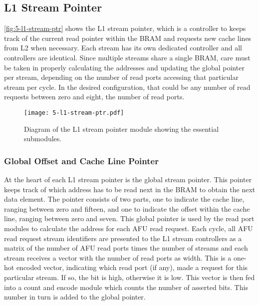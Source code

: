 \subsection{L1 Stream Pointer}
\label{sec:l1-ptr}
\autoref{fig:5-l1-stream-ptr} shows the L1 stream pointer, which is a controller to keeps track of the current read pointer within the BRAM and requests new cache lines from L2 when necessary. Each stream has its own dedicated controller and all controllers are identical. Since multiple streams share a single BRAM, care must be taken in properly calculating the addresses and updating the global pointer per stream, depending on the number of read ports accessing that particular stream per cycle. In the desired configuration, that could be any number of read requests between zero and eight, the number of read ports.

\begin{figure}[H]
  \centering
  \texttt{[image: 5-l1-stream-ptr.pdf]}
  \caption{Diagram of the L1 stream pointer module showing the essential submodules.}
  \label{fig:5-l1-stream-ptr}
\end{figure}

\subsubsection{Global Offset and Cache Line Pointer}
At the heart of each L1 stream pointer is the global stream pointer. This pointer keeps track of which address has to be read next in the BRAM to obtain the next data element. The pointer consists of two parts, one to indicate the cache line, ranging between zero and fifteen, and one to indicate the offset within the cache line, ranging between zero and seven. This global pointer is used by the read port modules to calculate the address for each AFU read request. Each cycle, all AFU read request stream identifiers are presented to the L1 stream controllers as a matrix of the number of AFU read ports times the number of streams and each stream receives a vector with the number of read ports as width. This is a one-hot encoded vector, indicating which read port (if any), made a request for this particular stream. If so, the bit is high, otherwise it is low. This vector is then fed into a count and encode module which counts the number of asserted bits. This number in turn is added to the global pointer.

